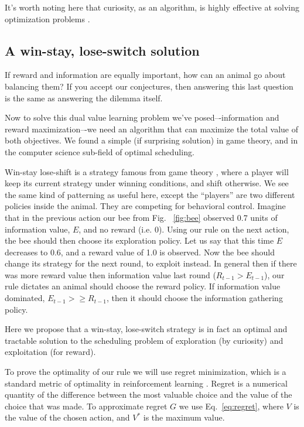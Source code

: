 It's worth noting here that curiosity, as an algorithm, is highly effective at solving optimization problems \cite{Schmidhuber1991,Pathak2017,Stanton2018,Lehman201,Mouret2011b1,Fister2019,Mouret2015,Colas2020,Cully2015,Pathak2017,Schwartenbeck2019.Laversanne-Finot2018}. 


\subsection{A win-stay, lose-switch solution}
If reward and information are equally important, how can an animal go about balancing them? If you accept our conjectures, then answering this last question is the same as answering the dilemma itself. 

Now to solve this dual value learning problem we’ve posed–-information and reward maximization–-we need an algorithm that can maximize the total value of both objectives. We found a simple (if surprising solution) in game theory, and in the computer science sub-field of optimal scheduling.

Win-stay lose-shift is a strategy famous from game theory \citep{Nowak1993}, where a player will keep its current strategy under winning conditions, and shift otherwise. We see the same kind of patterning as useful here, except the ``players'' are two different policies inside the animal. They are competing for behavioral control. Imagine that in the previous action our bee from Fig. ~\ref{fig:bee} observed 0.7 units of information value, $E$, and no reward (i.e. 0). Using our rule on the next action, the bee should then choose its exploration policy. Let us say that this time $E$ decreases to 0.6, and a reward value of 1.0 is observed. Now the bee should change its strategy for the next round, to exploit instead. In general then if there was more reward value then information value last round ($R_{t-1} > E_{t-1}$), our rule dictates an animal should choose the reward policy. If information value dominated, $E_{t-1} >\ge R_{t-1}$, then it should choose the information gathering policy.

Here we propose that a win-stay, lose-switch strategy is in fact an optimal and tractable solution to the scheduling problem of exploration (by curiosity) and exploitation (for reward).

To prove the optimality of our rule we will use regret minimization, which is a standard metric of optimality in reinforcement learning \citep{Sutton2018}. Regret is a numerical quantity of the difference between the most valuable choice and the value of the choice that was made. To approximate regret $G$ we use Eq.~\ref{eq:regret}, where $V$ is the value of the chosen action, and $V^*$ is the maximum value. 

